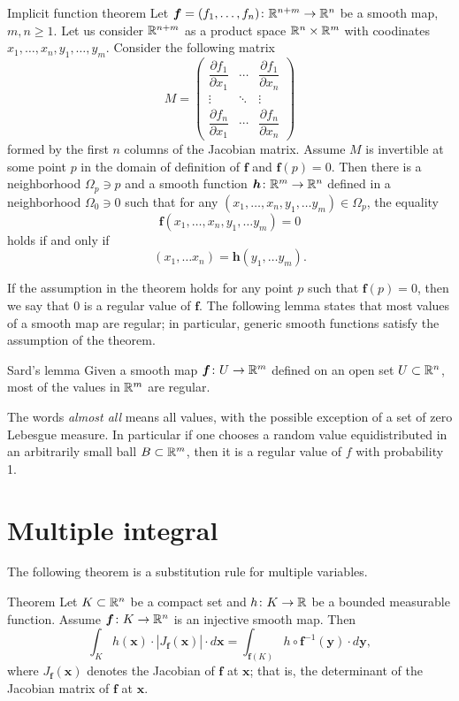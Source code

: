 \begin{thm}{Implicit function theorem}\label{thm:imlicit}
Let $\bm{f}=(f_1,\dots,f_n)\colon\mathbb{R}^{n+m}\to\mathbb{R}^n$ be a smooth map,
$m,n\ge 1$.
Let us consider $\mathbb{R}^{n+m}$ as a product space $\mathbb{R}^n\times \mathbb{R}^m$ with coodinates 
$x_1,\dots,x_n,y_1,\dots,y_m$.
Consider the following matrix 
\[
M=\begin{pmatrix}
\dfrac{\partial f_1}{\partial x_1} & \cdots & \dfrac{\partial f_1}{\partial x_n}\\
\vdots & \ddots & \vdots\\
\dfrac{\partial f_n}{\partial x_1} & \cdots & \dfrac{\partial f_n}{\partial x_n} \end{pmatrix}\]
formed by the first $n$ columns of the Jacobian matrix.
Assume $M$ is invertible at some point $p$ in the domain of definition of $\bm{f}$ and $\bm{f}(p)=0$.
Then there is a neighborhood $\Omega_p\ni p$
and a smooth function $\bm{h}\colon\mathbb{R}^m\to\mathbb{R}^n$ defined in a neighborhood $\Omega_0\ni 0$ such that
for any $(x_1,\dots,x_n,y_1,\dots y_m)\in \Omega_p$, the equality
\[\bm{f}(x_1,\dots,x_n,y_1,\dots y_m)=0\]
holds if and only if 
\[(x_1,\dots x_n)=\bm{h}(y_1,\dots y_m).\]

\end{thm}

If the assumption in the theorem holds for any point $p$ such that $\bm{f}(p)=0$,
then we say that $0$ is a regular value of $\bm{f}$.
The following lemma states that most values of a smooth map are regular;
in particular, generic smooth functions satisfy the assumption of the theorem.

\begin{thm}{Sard's lemma}\label{lem:sard}
Given a smooth map $\bm{f}\colon U \z\to \RR^m$ defined on an open set $U\subset \mathbb{R}^n$, most of the values in $\mathbb{R}^m$ are regular.
\end{thm}

The words \emph{almost all} means all values, with the possible exception of a set of zero Lebesgue measure.
In particular if one chooses a random value equidistributed in an arbitrarily small ball $B\subset \mathbb{R}^m$, then it is a regular value of $f$ with probability 1.


\section{Multiple integral}

The following theorem is a substitution rule for multiple variables.

\begin{thm}{Theorem}\label{thm:mult-substitution}
Let $K\subset \mathbb{R}^n$ be a compact set and $h\colon K\to\mathbb{R}$ be a bounded measurable function.
Assume $\bm{f}\colon K\to \mathbb{R}^n$ is an injective smooth map.
Then 
\[\int_K h(\bm{x})\cdot |J_{\bm{f}}(\bm{x})|\cdot d\bm{x}
=
\int_{\bm{f}(K)} h\circ \bm{f}^{-1}(\bm{y})\cdot d\bm{y},\]
where $J_{\bm{f}}(\bm{x})$ denotes the Jacobian of $\bm{f}$ at $\bm{x}$;
that is, the determinant of the Jacobian matrix of $\bm{f}$ at $\bm{x}$.

\end{thm}


